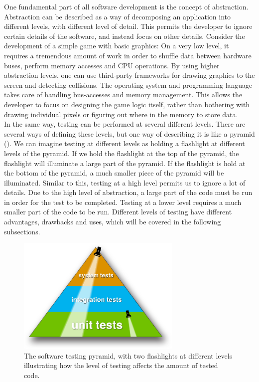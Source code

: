 
\label{sec:theory_levels}

One fundamental part of all software development is the concept of
abstraction. Abstraction can be described as a way of decomposing an
application into different levels, with different level of detail. This
permits the developer to ignore certain details of the software, and
instead focus on other details. Consider the development of a simple
game with basic graphics: On a very low level, it requires a tremendous
amount of work in order to shuffle data between hardware buses, perform
memory accesses and CPU operations. By using higher abstraction levels,
one can use third-party frameworks for drawing graphics to the screen
and detecting collisions. The operating system and programming language
takes care of handling bus-accesses and memory management. This allows
the developer to focus on designing the game logic itself, rather than
bothering with drawing individual pixels or figuring out where in the
memory to store data. \cite{paper:abstraction}\\

In the same way, testing can be performed at several different levels.
There are several ways of defining these levels, but one way of
describing it is like a pyramid (). We can
imagine testing at different levels as holding a flashlight at different
levels of the pyramid. If we hold the flashlight at the top of the
pyramid, the flashlight will illuminate a large part of the pyramid. If
the flashlight is hold at the bottom of the pyramid, a much smaller
piece of the pyramid will be illuminated. Similar to this, testing at a
high level permits us to ignore a lot of details. Due to the high level
of abstraction, a large part of the code must be run in order for the
test to be completed. Testing at a lower level requires a much smaller part
of the code to be run. Different levels of testing have different
advantages, drawbacks and uses, which will be covered in the following
subsections.\\

\begin{figure}
\centering
\includegraphics[width=0.7\textwidth]{theory/levels/triangle}
\caption{The software testing pyramid, with two flashlights at different
         levels illustrating how the level of testing affects the amount
         of tested code.}
\label{fig:testing_pyramid}
\end{figure}
